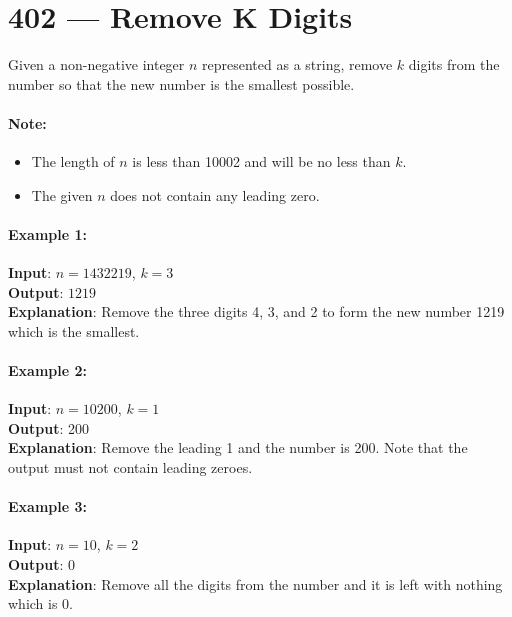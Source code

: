 \section{402 --- Remove K Digits}
Given a non-negative integer $n$ represented as a string, remove $k$ digits from the number so that the new number is the smallest possible.
\par
\paragraph{Note:}

\begin{itemize}
\item     The length of $ n $ is less than 10002 and will be no less than $ k $.
\item     The given $ n $ does not contain any leading zero.

\end{itemize}

\paragraph{Example 1:}

\begin{flushleft}
\textbf{Input}: $n = 1432219$, $k = 3$
\\
\textbf{Output}: $1219$
\\
\textbf{Explanation}: Remove the three digits 4, 3, and 2 to form the new number 1219 which is the smallest.
\end{flushleft}

\paragraph{Example 2:}

\begin{flushleft}
\textbf{Input}: $n = 10200$, $k = 1$
\\
\textbf{Output}: 200
\\
\textbf{Explanation}: Remove the leading 1 and the number is 200. Note that the output must not contain leading zeroes.
\end{flushleft}

\paragraph{Example 3:}

\begin{flushleft}
\textbf{Input}: $n = 10$, $k = 2$
\\
\textbf{Output}: 0
\\
\textbf{Explanation}: Remove all the digits from the number and it is left with nothing which is 0.

\end{flushleft}

